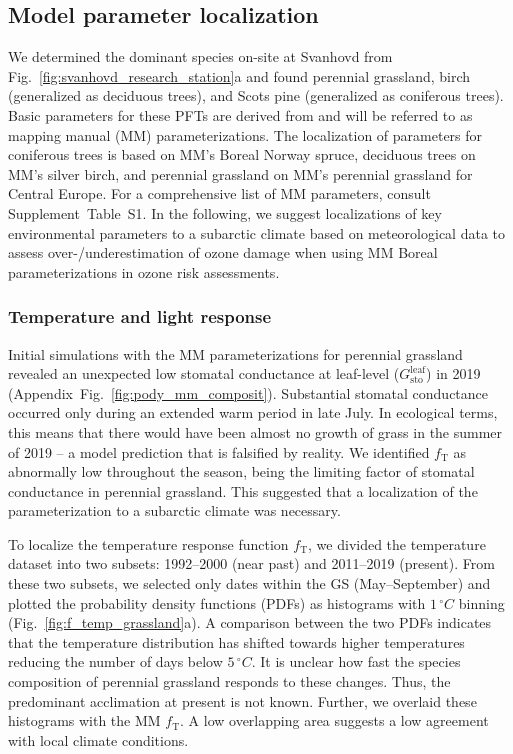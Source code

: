 \documentclass[bg, manuscript]{copernicus}
\begin{document}
\subsection{Model parameter localization}
\label{sec:localization}

We determined the dominant species on-site at Svanhovd from Fig.~\ref{fig:svanhovd_research_station}a and found perennial grassland, birch (generalized as deciduous trees), and Scots pine (generalized as coniferous trees). Basic parameters for these PFTs are derived from \citet{EP:Simpson2007,GCB:Mills2011,ICP:MappingManual2017} and will be referred to as mapping manual (MM) parameterizations. The localization of parameters for coniferous trees is based on MM's Boreal Norway spruce, deciduous trees on MM's silver birch, and perennial grassland on MM's perennial grassland for Central Europe. For a comprehensive list of MM parameters, consult Supplement~Table~S1. In the following, we suggest localizations of key environmental parameters to a subarctic climate based on meteorological data to assess over-/underestimation of ozone damage when using MM Boreal parameterizations in ozone risk assessments.

\subsubsection{Temperature and light response}

Initial simulations with the MM parameterizations for perennial grassland revealed an unexpected low stomatal conductance at leaf-level ($G_\mathrm{sto}^\mathrm{leaf}$) in 2019 (Appendix~Fig.~\ref{fig:pody_mm_composit}). Substantial stomatal conductance occurred only during an extended warm period in late July. In ecological terms, this means that there would have been almost no growth of grass in the summer of 2019 -- a model prediction that is falsified by reality. We identified $f_\mathrm{T}$ as abnormally low throughout the season, being the limiting factor of stomatal conductance in perennial grassland. This suggested that a localization of the parameterization to a subarctic climate was necessary.

To localize the temperature response function $f_\mathrm{T}$, we divided the temperature dataset into two subsets: 1992--2000 (near past) and 2011--2019 (present). From these two subsets, we selected only dates within the GS (May--September) and plotted the probability density functions (PDFs) as histograms with $1\,\unit{^\circ C}$ binning (Fig.~\ref{fig:f_temp_grassland}a). A comparison between the two PDFs indicates that the temperature distribution has shifted towards higher temperatures reducing the number of days below $5\,\unit{^\circ C}$. It is unclear how fast the species composition of perennial grassland responds to these changes. Thus, the predominant acclimation at present is not known. Further, we overlaid these histograms with the MM $f_\mathrm{T}$. A low overlapping area suggests a low agreement with local climate conditions. 
\end{document}
